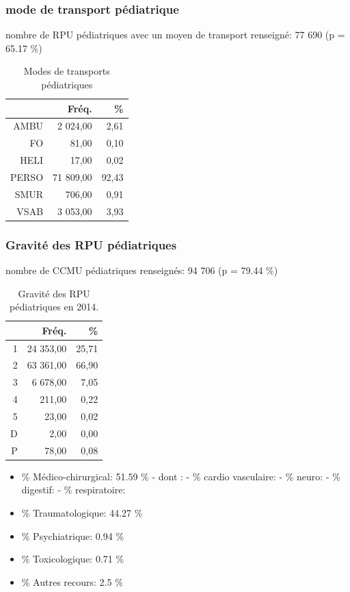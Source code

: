 \documentclass[]{article}
\begin{document}
\subsubsection{mode de transport
pédiatrique}\label{mode-de-transport-pediatrique}

nombre de RPU pédiatriques avec un moyen de transport renseigné: 77 690
(p = 65.17 \%)

\begin{table}[ht]
\centering
\begin{tabular}{rrr}
  \hline
 & Fréq. & \% \\ 
  \hline
AMBU & 2 024,00 & 2,61 \\ 
  FO & 81,00 & 0,10 \\ 
  HELI & 17,00 & 0,02 \\ 
  PERSO & 71 809,00 & 92,43 \\ 
  SMUR & 706,00 & 0,91 \\ 
  VSAB & 3 053,00 & 3,93 \\ 
   \hline
\end{tabular}
\caption{Modes de transports pédiatriques} 
\end{table}

\subsubsection{Gravité des RPU
pédiatriques}\label{gravite-des-rpu-pediatriques}

nombre de CCMU pédiatriques renseignés: 94 706 (p = 79.44 \%)

\begin{table}[ht]
\centering
\begin{tabular}{rrr}
  \hline
 & Fréq. & \% \\ 
  \hline
1 & 24 353,00 & 25,71 \\ 
  2 & 63 361,00 & 66,90 \\ 
  3 & 6 678,00 & 7,05 \\ 
  4 & 211,00 & 0,22 \\ 
  5 & 23,00 & 0,02 \\ 
  D & 2,00 & 0,00 \\ 
  P & 78,00 & 0,08 \\ 
   \hline
\end{tabular}
\caption{Gravité des RPU pédiatriques en 2014.} 
\end{table}

\begin{itemize}
\itemsep1pt\parskip0pt
\item
  \% Médico-chirurgical: 51.59 \% - dont : - \% cardio vasculaire: - \%
  neuro: - \% digestif: - \% respiratoire:
\item
  \% Traumatologique: 44.27 \%
\item
  \% Psychiatrique: 0.94 \%
\item
  \% Toxicologique: 0.71 \%
\item
  \% Autres recours: 2.5 \%
\end{itemize}
\end{document}
